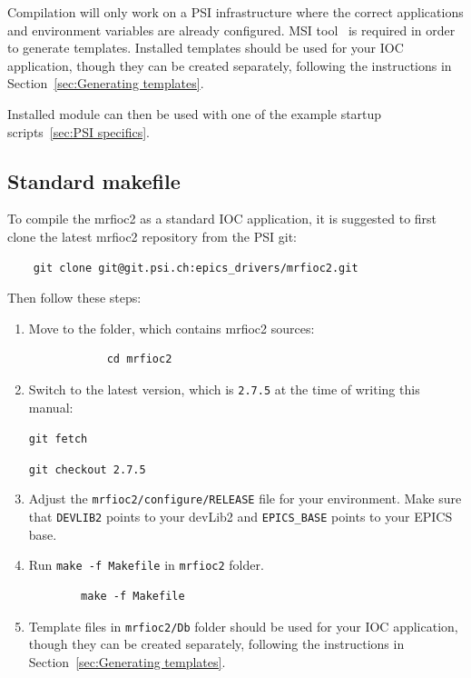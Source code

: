 \documentclass[12pt,a4paper]{article}
\newcommand{\latestDriverVersion}{2.7.5}
\begin{document}
Compilation will only work on a PSI infrastructure where the correct applications and environment variables are already configured. MSI tool~\cite{msi} is required in order to generate templates. Installed templates should be used for your IOC application, though they can be created separately, following the instructions in Section~\ref{sec:Generating templates}.

Installed module can then be used with one of the example startup scripts~\ref{sec:PSI specifics}.

\subsection{Standard makefile}\label{sec:Standard makefile}
To compile the mrfioc2 as a standard IOC application, it is suggested to first clone the latest mrfioc2 repository from the PSI git: 
\begin{verbatim}
	git clone git@git.psi.ch:epics_drivers/mrfioc2.git
\end{verbatim}

Then follow these steps:
\begin{enumerate}
	\item 
		Move to the folder, which contains mrfioc2 sources:
		\begin{verbatim}
			cd mrfioc2
		\end{verbatim}
		
	\item 
		Switch to the latest version, which is \texttt{\latestDriverVersion} at the time of writing this manual:
		
		\texttt{git fetch}
		
		\texttt{git checkout \latestDriverVersion}
		
	\item 
		Adjust the \texttt{mrfioc2/configure/RELEASE} file for your environment. Make sure that \texttt{DEVLIB2} points to your devLib2 and \texttt{EPICS\_BASE} points to your EPICS base.
	\item 
		Run \texttt{make -f Makefile} in \texttt{mrfioc2} folder.
		\begin{verbatim}
		make -f Makefile
		\end{verbatim}
	\item 
		Template files in \texttt{mrfioc2/Db} folder should be used for your IOC application, though they can be created separately, following the instructions in Section~\ref{sec:Generating templates}.
\end{enumerate}
\end{document}
